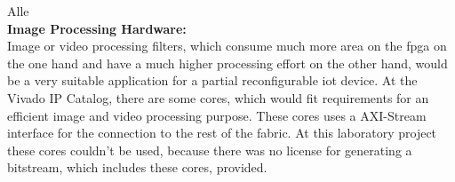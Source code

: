 Alle\\
\textbf{Image Processing Hardware:}\\
Image or video processing filters, which consume much more area on the \gls{fpga} on the one hand and have a much higher processing effort on the other hand, would be a very suitable application for a partial reconfigurable \gls{iot} device. At the Vivado IP Catalog, there are some cores, which would fit requirements for an efficient image and video processing purpose. These cores uses a AXI-Stream interface for the connection to the rest of the fabric. At this laboratory project these cores couldn't be used, because there was no license for generating a bitstream, which includes these cores, provided.